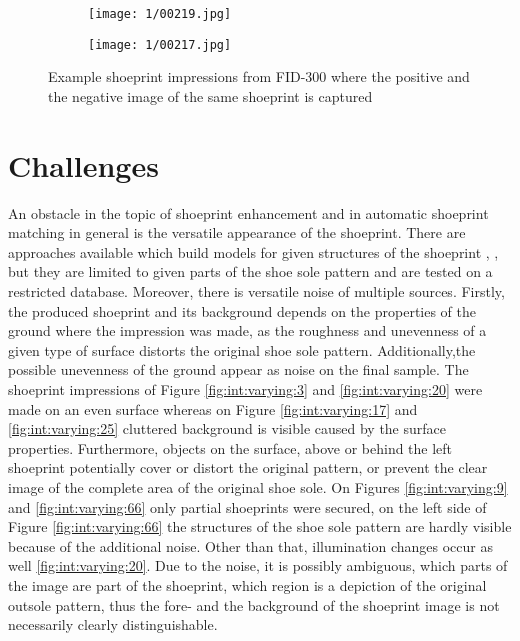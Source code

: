 \documentclass[draft,final]{vutinfth} %
\begin{document}
\begin{figure}[h]
  \centering
  \begin{subfigure}[t]{0.45\columnwidth}
    \centering
    \texttt{[image: 1/00219.jpg]}
	\caption{}
	\label{fig:int:cap:pos}
  \end{subfigure}
  \begin{subfigure}[t]{0.45\columnwidth}
    \centering
    \texttt{[image: 1/00217.jpg]}
	\caption{}
	\label{fig:int:cap:neg}
  \end{subfigure}
  \caption{Example shoeprint impressions from FID-300 where the positive and the negative image of the same shoeprint is captured}
  \label{fig:int:cap}
\end{figure}

\section{Challenges}
\par
An obstacle in the topic of shoeprint enhancement and in automatic shoeprint matching in general is the versatile appearance of the shoeprint.
There are approaches available which build models for given structures of the shoeprint \cite{tang2010footwear}, \cite{alizadeh2017automatic}, but they are limited to given parts of the shoe sole pattern and are tested on a restricted database.
Moreover, there is versatile noise of multiple sources.
Firstly, the produced shoeprint and its background depends on the properties of the ground where the impression was made, as the roughness and unevenness of a given type of surface distorts the original shoe sole pattern.
Additionally,the possible unevenness of the ground appear as noise on the final sample.
The shoeprint impressions of Figure \ref{fig:int:varying:3} and \ref{fig:int:varying:20} were made on an even surface whereas on Figure \ref{fig:int:varying:17} and \ref{fig:int:varying:25} cluttered background is visible caused by the surface properties.
Furthermore, objects on the surface, above or behind the left shoeprint potentially cover or distort the original pattern, or prevent the clear image of the complete area of the original shoe sole.
On Figures \ref{fig:int:varying:9} and \ref{fig:int:varying:66} only partial shoeprints were secured, on the left side of Figure \ref{fig:int:varying:66} the structures of the shoe sole pattern are hardly visible because of the additional noise.
Other than that, illumination changes occur as well \ref{fig:int:varying:20}.
Due to the noise, it is possibly ambiguous, which parts of the image are part of the shoeprint, which region is a depiction of the original outsole pattern, thus the fore- and the background of the shoeprint image is not necessarily clearly distinguishable.
\end{document}
